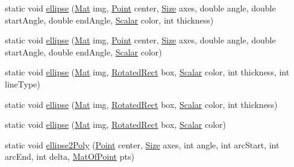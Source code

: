 \begin{DoxyCompactItemize}
\item 
static void \mbox{\hyperlink{classorg_1_1opencv_1_1core_1_1_core_a55af7b6ca8fdb3e8c2d13cca74081267}{ellipse}} (\mbox{\hyperlink{classorg_1_1opencv_1_1core_1_1_mat}{Mat}} img, \mbox{\hyperlink{classorg_1_1opencv_1_1core_1_1_point}{Point}} center, \mbox{\hyperlink{classorg_1_1opencv_1_1core_1_1_size}{Size}} axes, double angle, double start\+Angle, double end\+Angle, \mbox{\hyperlink{classorg_1_1opencv_1_1core_1_1_scalar}{Scalar}} color, int thickness)
\item 
static void \mbox{\hyperlink{classorg_1_1opencv_1_1core_1_1_core_a288c270183c0a0930910e55bf421c1a2}{ellipse}} (\mbox{\hyperlink{classorg_1_1opencv_1_1core_1_1_mat}{Mat}} img, \mbox{\hyperlink{classorg_1_1opencv_1_1core_1_1_point}{Point}} center, \mbox{\hyperlink{classorg_1_1opencv_1_1core_1_1_size}{Size}} axes, double angle, double start\+Angle, double end\+Angle, \mbox{\hyperlink{classorg_1_1opencv_1_1core_1_1_scalar}{Scalar}} color)
\item 
static void \mbox{\hyperlink{classorg_1_1opencv_1_1core_1_1_core_a90332fb5cef2fa8e33b3e304f7c868ff}{ellipse}} (\mbox{\hyperlink{classorg_1_1opencv_1_1core_1_1_mat}{Mat}} img, \mbox{\hyperlink{classorg_1_1opencv_1_1core_1_1_rotated_rect}{Rotated\+Rect}} box, \mbox{\hyperlink{classorg_1_1opencv_1_1core_1_1_scalar}{Scalar}} color, int thickness, int line\+Type)
\item 
static void \mbox{\hyperlink{classorg_1_1opencv_1_1core_1_1_core_ab32656b0a495ca643801145d700afcc4}{ellipse}} (\mbox{\hyperlink{classorg_1_1opencv_1_1core_1_1_mat}{Mat}} img, \mbox{\hyperlink{classorg_1_1opencv_1_1core_1_1_rotated_rect}{Rotated\+Rect}} box, \mbox{\hyperlink{classorg_1_1opencv_1_1core_1_1_scalar}{Scalar}} color, int thickness)
\item 
static void \mbox{\hyperlink{classorg_1_1opencv_1_1core_1_1_core_a31b26443f36f448e4ed2714ca3558150}{ellipse}} (\mbox{\hyperlink{classorg_1_1opencv_1_1core_1_1_mat}{Mat}} img, \mbox{\hyperlink{classorg_1_1opencv_1_1core_1_1_rotated_rect}{Rotated\+Rect}} box, \mbox{\hyperlink{classorg_1_1opencv_1_1core_1_1_scalar}{Scalar}} color)
\item 
static void \mbox{\hyperlink{classorg_1_1opencv_1_1core_1_1_core_ab4ab635dc04de40b7dd1722a99bfcc34}{ellipse2\+Poly}} (\mbox{\hyperlink{classorg_1_1opencv_1_1core_1_1_point}{Point}} center, \mbox{\hyperlink{classorg_1_1opencv_1_1core_1_1_size}{Size}} axes, int angle, int arc\+Start, int arc\+End, int delta, \mbox{\hyperlink{classorg_1_1opencv_1_1core_1_1_mat_of_point}{Mat\+Of\+Point}} pts)

\end{DoxyCompactItemize}
